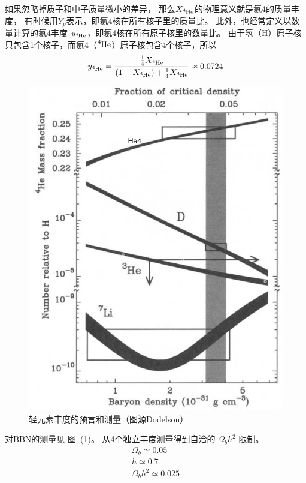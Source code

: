 \documentclass[12pt]{ctexart}
\newcommand{\reffig}[1]{图~(\ref{#1})}
\begin{document}
如果忽略掉质子和中子质量微小的差异，
那么$X_{\ce{^{4}He}}$的物理意义就是氦4的质量丰度，
有时候用$Y_p$表示，即氦4核在所有核子里的质量比。
此外，也经常定义以数量计算的氦4丰度 $y_{\ce{^{4}He}}$，即氦4核在所有原子核里的数量比。
由于氢（H）原子核只包含1个核子，而氦4（$\ce{^{4}He}$）原子核包含4个核子，所以\\
\begin{equation}
    y_{\ce{^{4}He}} = \frac{ \frac{1}{4} X_{\ce{^{4}He}}}{ (1- X_{\ce{^{4}He}}) +  \frac{1}{4} X_{\ce{^{4}He}} } \approx 0.0724
\end{equation}

\begin{figure}[!hbtp]
	\centering
	\includegraphics[width=1.0\linewidth]{BBN.png}
	\caption{轻元素丰度的预言和测量（图源Dodelson）} \label{fig:BBN}
\end{figure}

对BBN的测量见 \reffig{fig:BBN}。
从4个独立丰度测量得到自洽的 $\Omega_b h^2$ 限制。
\begin{eqnarray}
    \Omega_b \simeq 0.05 \\ 
    h\simeq 0.7 \\ 
    \Omega_b h^2 \simeq 0.025
\end{eqnarray}
\end{document}
